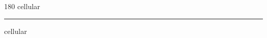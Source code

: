 
\begin{frame}
\begin{center}
\begin{turn}{180}
{\fontsize{2.5cm}{1em}\selectfont cellular}
\end{turn}
\vspace{1em}\par  
\hrule
\vspace{1em}\par  
{\fontsize{2.5cm}{1em}\selectfont cellular}
\end{center}
\end{frame}
